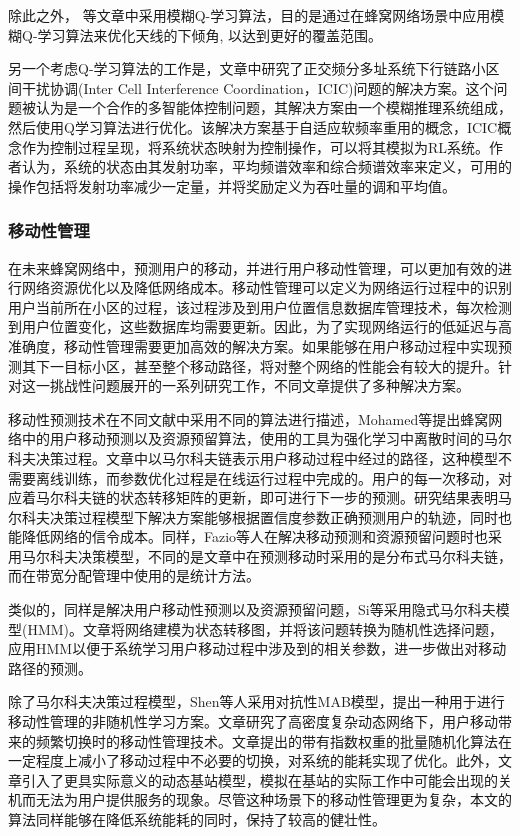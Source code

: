 \documentclass{IEEEtran}
\begin{document}
除此之外，\cite{Razavi2010}\cite{Razavi2010a}\cite{Islam2012} 等文章中采用模糊Q-学习算法，目的是通过在蜂窝网络场景中应用模糊Q-学习算法来优化天线的下倾角, 以达到更好的覆盖范围。

另一个考虑Q-学习算法的工作是\cite{Dirani2010}，文章中研究了正交频分多址系统下行链路小区间干扰协调(Inter Cell Interference Coordination，ICIC)问题的解决方案。这个问题被认为是一个合作的多智能体控制问题，其解决方案由一个模糊推理系统组成，然后使用Q学习算法进行优化。该解决方案基于自适应软频率重用的概念，ICIC概念作为控制过程呈现，将系统状态映射为控制操作，可以将其模拟为RL系统。作者认为，系统的状态由其发射功率，平均频谱效率和综合频谱效率来定义，可用的操作包括将发射功率减少一定量，并将奖励定义为吞吐量的调和平均值。


\subsubsection{移动性管理}
在未来蜂窝网络中，预测用户的移动，并进行用户移动性管理，可以更加有效的进行网络资源优化以及降低网络成本。移动性管理可以定义为网络运行过程中的识别用户当前所在小区的过程，该过程涉及到用户位置信息数据库管理技术，每次检测到用户位置变化，这些数据库均需要更新。因此，为了实现网络运行的低延迟与高准确度，移动性管理需要更加高效的解决方案。如果能够在用户移动过程中实现预测其下一目标小区，甚至整个移动路径，将对整个网络的性能会有较大的提升。针对这一挑战性问题展开的一系列研究工作，不同文章提供了多种解决方案。

移动性预测技术在不同文献中采用不同的算法进行描述，Mohamed等\cite{Mohamed2015}提出蜂窝网络中的用户移动预测以及资源预留算法，使用的工具为强化学习中离散时间的马尔科夫决策过程。文章中以马尔科夫链表示用户移动过程中经过的路径，这种模型不需要离线训练，而参数优化过程是在线运行过程中完成的。用户的每一次移动，对应着马尔科夫链的状态转移矩阵的更新，即可进行下一步的预测。研究结果表明马尔科夫决策过程模型下解决方案能够根据置信度参数正确预测用户的轨迹，同时也能降低网络的信令成本。同样，Fazio等人\cite{Fazio2013}在解决移动预测和资源预留问题时也采用马尔科夫决策模型，不同的是文章中在预测移动时采用的是分布式马尔科夫链，而在带宽分配管理中使用的是统计方法。

类似的，同样是解决用户移动性预测以及资源预留问题，Si等\cite{Si2010}采用隐式马尔科夫模型(HMM)。文章将网络建模为状态转移图，并将该问题转换为随机性选择问题，应用HMM以便于系统学习用户移动过程中涉及到的相关参数，进一步做出对移动路径的预测。

除了马尔科夫决策过程模型，Shen等人采用对抗性MAB模型\cite{Shen2016}，提出一种用于进行移动性管理的非随机性学习方案。文章研究了高密度复杂动态网络下，用户移动带来的频繁切换时的移动性管理技术。文章提出的带有指数权重的批量随机化算法在一定程度上减小了移动过程中不必要的切换，对系统的能耗实现了优化。此外，文章引入了更具实际意义的动态基站模型，模拟在基站的实际工作中可能会出现的关机而无法为用户提供服务的现象。尽管这种场景下的移动性管理更为复杂，本文的算法同样能够在降低系统能耗的同时，保持了较高的健壮性。
\end{document}
